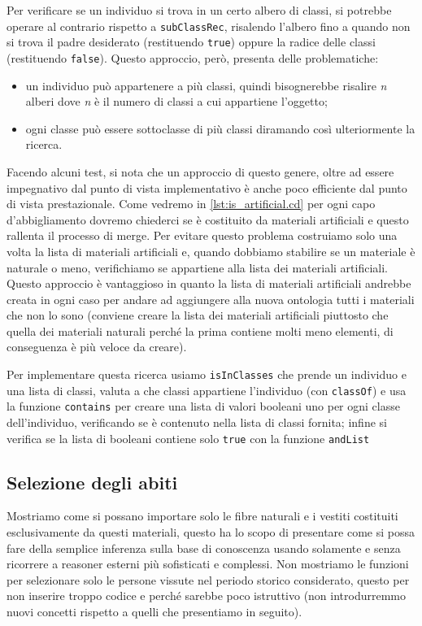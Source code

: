 Per verificare se un individuo si trova in un certo albero di classi, si potrebbe operare al contrario rispetto a \verb|subClassRec|, risalendo l'albero fino a quando non si trova il padre desiderato (restituendo \verb|true|) oppure la radice delle classi (restituendo \verb|false|). Questo approccio, però, presenta delle problematiche:
\begin{itemize}
	\item un individuo può appartenere a più classi, quindi bisognerebbe risalire \emph{n} alberi dove \emph{n} è il numero di classi a cui appartiene l'oggetto;
	\item ogni classe può essere sottoclasse di più classi diramando così ulteriormente la ricerca.
\end{itemize}
Facendo alcuni test, si nota che un approccio di questo genere, oltre ad essere impegnativo dal punto di vista implementativo è anche poco efficiente dal punto di vista prestazionale. Come vedremo in \ref{lst:is_artificial.cd} per ogni capo d'abbigliamento dovremo chiederci se è costituito da materiali artificiali e questo rallenta il processo di merge. Per evitare questo problema costruiamo solo una volta la lista di materiali artificiali e, quando dobbiamo stabilire se un materiale è naturale o meno, verifichiamo se appartiene alla lista dei materiali artificiali. Questo approccio è vantaggioso in quanto la lista di materiali artificiali andrebbe creata in ogni caso per andare ad aggiungere alla nuova ontologia tutti i materiali che non lo sono (conviene creare la lista dei materiali artificiali piuttosto che quella dei materiali naturali perché la prima contiene molti meno elementi, di conseguenza è più veloce da creare).

Per implementare questa ricerca usiamo \verb|isInClasses| che prende un individuo e una lista di classi, valuta a che classi appartiene l'individuo (con \verb|classOf|) e usa la funzione \verb|contains| per creare una lista di valori booleani uno per ogni classe dell'individuo, verificando se è contenuto nella lista di classi fornita; infine si verifica se la lista di booleani contiene solo \verb|true| con la funzione \verb|andList|

\subsection{Selezione degli abiti}
Mostriamo come si possano importare solo le fibre naturali e i vestiti costituiti esclusivamente da questi materiali, questo ha lo scopo di presentare come si possa fare della semplice inferenza sulla base di conoscenza usando solamente \cduce e senza ricorrere a reasoner esterni più sofisticati e complessi. Non mostriamo le funzioni per selezionare solo le persone vissute nel periodo storico considerato, questo per non inserire troppo codice e perché sarebbe poco istruttivo (non introdurremmo nuovi concetti rispetto a quelli che presentiamo in seguito).

